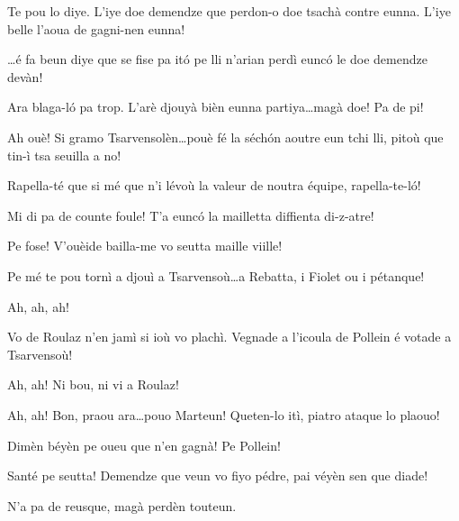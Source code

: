 \begin{drama}

\Selmospeaks	Te pou lo diye. L'iye doe demendze que perdon-o doe tsachà contre eunna. L'iye belle l'aoua de gagni-nen eunna!

\Djouiyaoueunspeaks{} \ldots é fa beun diye que se fise pa it\'o pe lli n'arian perdì eunc\'o le doe demendze devàn!

\Djouiyaoudouspeaks Ara blaga-l\'o pa trop. L’arè djouyà bièn eunna partiya\ldots magà doe! Pa de pi!

\Selmospeaks Ah ouè!  Si gramo Tsarvensolèn\ldots pouè fé la séch\'on aoutre eun tchi lli, pitoù que tin-ì tsa seuilla a no!

\Marteunspeaks  Rapella-té que si mé que n’i lévoù la valeur de noutra équipe, rapella-te-l\'o!

\Selmospeaks Mi di pa de counte foule! T'a eunc\'o la mailletta diffienta di-z-atre!

\Marteunspeaks Pe fose! V'ouèide bailla-me vo seutta maille viille!

\Djouiyaoudouspeaks{} Pe mé te pou tornì a djouì a Tsarvensoù\ldots a Rebatta, i Fiolet ou i pétanque!

\Selmospeaks Ah, ah, ah!

\Djouiyaoueunspeaks Vo de Roulaz n'en jamì si ioù vo plachì. Vegnade a l'icoula de Pollein é votade a Tsarvensoù!

\Djouiyaoudouspeaks Ah, ah! Ni bou, ni vi a Roulaz!

\Selmospeaks Ah, ah!  Bon, praou ara\ldots pouo Marteun! Queten-lo itì, piatro ataque lo plaouo!

\Djouiyaoueunspeaks{} Dimèn béyèn pe oueu que n'en gagnà! Pe Pollein!


\Marteunspeaks Santé pe seutta!  Demendze que veun vo fiyo pédre, pai véyèn sen que diade!

\Selmospeaks N'a pa de reusque, magà perdèn touteun.





\end{drama}
